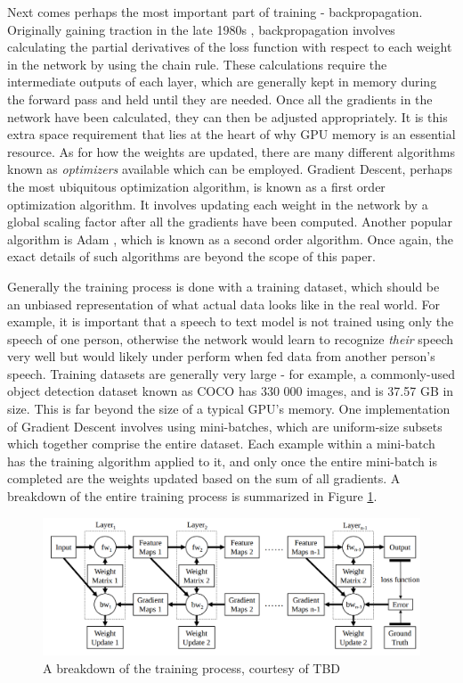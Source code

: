 \documentclass[12pt,letterpaper]{article}
\begin{document}
Next comes perhaps the most important part of training - backpropagation. Originally gaining traction in the late 1980s \cite{hinton_backpropagation}, backpropagation involves calculating the partial derivatives of the loss function with respect to each weight in the network by using the chain rule. These calculations require the intermediate outputs of each layer, which are generally kept in memory during the forward pass and held until they are needed. Once all the gradients in the network have been calculated, they can then be adjusted appropriately. It is this extra space requirement that lies at the heart of why GPU memory is an essential resource. As for how the weights are updated, there are many different algorithms known as \textit{optimizers} available \cite{optimizers} which can be employed. Gradient Descent, perhaps the most ubiquitous optimization algorithm, is known as a first order optimization algorithm. It involves updating each weight in the network by a global scaling factor after all the gradients have been computed. Another popular algorithm is Adam \cite{adam}, which is known as a second order algorithm. Once again, the exact details of such algorithms are beyond the scope of this paper.
\par

Generally the training process is done with a training dataset, which should be an unbiased representation of what actual data looks like in the real world. For example, it is important that a speech to text model is not trained using only the speech of one person, otherwise the network would learn to recognize \textit{their} speech very well but would likely under perform when fed data from another person's speech. Training datasets are generally very large - for example, a commonly-used object detection dataset known as COCO \cite{COCO} has 330 000 images, and is 37.57 GB in size. This is far beyond the size of a typical GPU's memory. One implementation of Gradient Descent involves using mini-batches, which are uniform-size subsets which together comprise the entire dataset. Each example within a mini-batch has the training algorithm applied to it, and only once the entire mini-batch is completed are the weights updated based on the sum of all gradients. A breakdown of the entire training process is summarized in Figure \ref{fig:training_memory_breakdown}.
\par

\begin{figure}[ht]
\centering
\includegraphics[width=1\textwidth]{training_memory_breakdown.png}
\captionsetup{width=0.7\linewidth}
\caption{A breakdown of the training process, courtesy of TBD \cite{tbd}}
\label{fig:training_memory_breakdown}
\end{figure}
\end{document}
